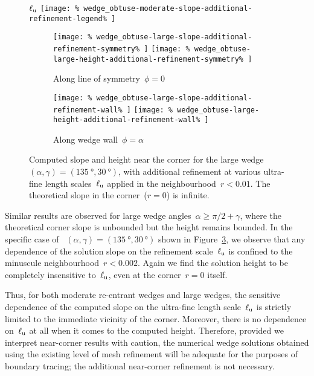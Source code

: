 \begin{figure}
  \newcommand*{\subfigurewidth}{0.4\textwidth}
  \centering
  $\ell_{\mathrm{u}}$
  \texttt{[image: \%
    wedge\_obtuse-moderate-slope-additional-refinement-legend\%
  ]}
  \hspace*{\fill}
  \begin{subfigure}[t]{\subfigurewidth}
    \texttt{[image: \%
      wedge\_obtuse-large-slope-additional-refinement-symmetry\%
    ]}
    \texttt{[image: \%
      wedge\_obtuse-large-height-additional-refinement-symmetry\%
    ]}
    \caption{%
      Along line of symmetry~$\phi = 0$
    }
    \label{fig:wedge_obtuse-large-additional-refinement-symmetry}
  \end{subfigure}
    \hfill
  \begin{subfigure}[t]{\subfigurewidth}
    \texttt{[image: \%
      wedge\_obtuse-large-slope-additional-refinement-wall\%
    ]}
    \texttt{[image: \%
      wedge\_obtuse-large-height-additional-refinement-wall\%
    ]}
    \caption{%
      Along wedge wall~$\phi = \alpha$
    }
    \label{fig:wedge_obtuse-large-additional-refinement-wall}
  \end{subfigure}
  \hspace*{\fill}
  \caption{
    Computed slope and height near the corner
    for the large wedge~%
      $(\alpha, \gamma) = (\SI{135}{\degree}, \SI{30}{\degree})$,
    with additional refinement
    at various ultra-fine length scales~$\ell_{\mathrm{u}}$
    applied in the neighbourhood~$r < 0.01$.
    The theoretical slope in the corner~($r = 0$) is infinite.
  }
  \label{fig:wedge_obtuse-large-additional-refinement}
\end{figure}

Similar results are observed
for large wedge angles~$\alpha \ge \pi/2 + \gamma$,
where the theoretical corner slope is unbounded
but the height remains bounded.
In the specific case of~%
  $(\alpha, \gamma) = (\SI{135}{\degree}, \SI{30}{\degree})$
shown in Figure~\ref{fig:wedge_obtuse-large-additional-refinement},
we observe that any dependence of the solution slope
on the refinement scale~$\ell_{\mathrm{u}}$
is confined to the minuscule neighbourhood~$r < 0.002$.
Again we find the solution height to be
completely insensitive to~$\ell_{\mathrm{u}}$,
even at the corner~$r = 0$ itself.

Thus, for both moderate re-entrant wedges and large wedges,
the sensitive dependence of the computed slope
on the ultra-fine length scale~$\ell_{\mathrm{u}}$
is strictly limited to the immediate vicinity of the corner.
Moreover, there is no dependence on~$\ell_{\mathrm{u}}$ at all
when it comes to the computed height.
Therefore, provided we interpret near-corner results with caution,
the numerical wedge solutions obtained
using the existing level of mesh refinement
will be adequate for the purposes of boundary tracing;
the additional near-corner refinement is not necessary.

